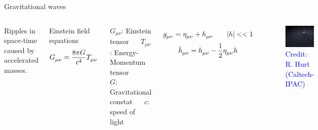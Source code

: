 \documentclass[pdf]{beamer}
\newcommand{\credit}[1]{\tiny{\textcolor{blue}{Credit: #1}}}
\begin{document}
\begin{frame}{Gravitational waves}
 \begin{columns}
 	\hspace{.5cm}
    Ripples in space-time caused by accelerated masses.
        
	
	\begin{block}{Einstein field equations}
	\begin{equation*}
    \tensor{G}{_\mu_\nu} = \dfrac{8\pi G}{c^4} \tensor{T}{_\mu_\nu}  
    \end{equation*}
	\end{block}
	\begin{tiny}
	$G_{\mu\nu}$: Einstein tensor $\quad$ $T_{\mu\nu}$: Energy-Momentum tensor\\
	$G$: Gravitational constat $\quad$ $c$: speed of light
	\end{tiny}
	
	
    \begin{equation*}
    \tensor{g}{_\mu_\nu} = \tensor{\eta}{_\mu_\nu} + \tensor{h}{_\mu_\nu} \qquad |h|<<1 
    \end{equation*}
    \begin{equation*}
    \tensor{\bar{h}}{_\mu_\nu} = \tensor{h}{_\mu_\nu} -\dfrac{1}{2} \tensor{\eta}{_\mu_\nu} h  
    \end{equation*}
    
    
    \begin{figure}
    \includegraphics[scale=.14]{fig/GravWave.jpg}
    \caption*{\credit{R. Hurt (Caltech-IPAC)}}
    \end{figure}
  \end{columns}

\end{frame}
\end{document}
